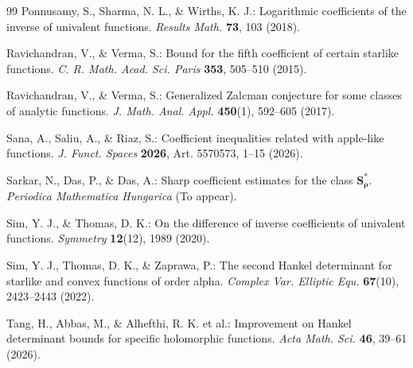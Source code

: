 \documentclass[11pt]{article}
\numberwithin{equation}{section}
\begin{document}
\begin{thebibliography}{99}
 Ponnusamy, S., Sharma, N. L., \& Wirths, K. J.: Logarithmic coefficients of the inverse of univalent functions. \emph{Results Math.} \textbf{73}, 103 (2018).

 Ravichandran, V., \& Verma, S.: Bound for the fifth coefficient of certain starlike functions. \emph{C. R. Math. Acad. Sci. Paris} \textbf{353}, 505--510 (2015).

 Ravichandran, V., \& Verma, S.: Generalized Zalcman conjecture for some classes of analytic functions. \emph{J. Math. Anal. Appl.} \textbf{450}(1), 592--605 (2017).

 Sana, A., Saliu, A., \& Riaz, S.: Coefficient inequalities related with apple-like functions. \emph{J. Funct. Spaces} \textbf{2026}, Art. 5570573, 1--15 (2026).

 Sarkar, N., Das, P., \& Das, A.: Sharp coefficient estimates for the class $\mathbf{S}_\mathbf{\rho}^\ast$. \emph{Periodica Mathematica Hungarica} (To appear).

 Sim, Y. J., \& Thomas, D. K.: On the difference of inverse coefficients of univalent functions. \emph{Symmetry} \textbf{12}(12), 1989 (2020).

 Sim, Y. J., Thomas, D. K., \& Zaprawa, P.: The second Hankel determinant for starlike and convex functions of order alpha. \emph{Complex Var. Elliptic Equ.} \textbf{67}(10), 2423--2443 (2022).

 Tang, H., Abbas, M., \& Alhefthi, R. K. et al.: Improvement on Hankel determinant bounds for specific holomorphic functions. \emph{Acta Math. Sci.} \textbf{46}, 39--61 (2026).

\end{thebibliography}
\end{document}
